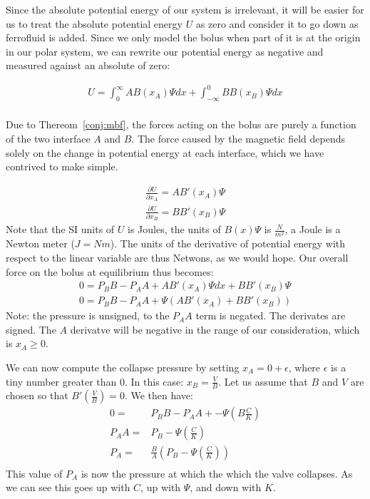 \documentclass{asme2ej}
\begin{document}
Since the absolute potential energy of our system is irrelevant,
it will be easier for us to treat the absolute potential energy $U$
as zero and consider it to go down as ferrofluid is added.
Since we only model the bolus when part of it is at the origin
in our polar system, we can rewrite our potential energy as negative
and measured against an absolute of zero:

\begin{align}
  U =  \int_0^{\infty} A B(x_A) \Psi dx + \int_{-\infty}^0 B B(x_B) \Psi dx \\
\end{align}

Due to Thereom~\ref{conj:mbf}, the forces acting on the bolus are purely a function
of the two interface $A$ and $B$.
The force caused by the magnetic field depends solely on the change in potential energy
at each interface, which we have contrived to make simple.

\begin{align}
  \frac{\partial U}{\partial x_A} =  A B'(x_A) \Psi  \\
  \frac{\partial U}{\partial x_B} = B B'(x_B) \Psi
\end{align}
Note that the SI units of $U$ is Joules, the units of $ B(x) \Psi$ is $\frac{N}{m^2}$,
a Joule is a Newton meter ($J = N m$).
The units of the derivative of potential energy with respect to the linear variable are
thus Netwons, as we would hope.
Our overall force on the bolus at equilibrium thus becomes:
\begin{align}
  0 = P_BB - P_AA +  A B'(x_A) \Psi dx + B B'(x_B) \Psi  \\
  0 = P_BB - P_AA +  \Psi ( A B'(x_A) + B B'(x_B))
\end{align}
Note: the pressure is unsigned, to the $P_AA$ term is negated. The derivates are signed. The $A$ derivatve will be negative
in the range of our consideration, which is $x_A \geq 0$.

We can now compute the collapse pressure by setting $x_A = 0 + \epsilon$, where $\epsilon$ is a
tiny number greater than $0$.
In this case: $x_B = \frac{V}{B}$. Let us assume that $B$ and $V$ are chosen
so that $B'(\frac{V}{B}) = 0$. We then have:
\begin{align}
  0 = & P_BB - P_AA +  -\Psi ( B \frac{C}{K} ) \\
  P_AA =& P_B   -\Psi ( \frac{C}{K} ) \\
  P_A =& \frac{B}{A} (P_B   -\Psi ( \frac{C}{K} )) \\
\end{align}
This value of $P_A$ is now the pressure at which the which the valve collapses.
As we can see this goes up with $C$, up with $\Psi$, and down with $K$.
\end{document}
